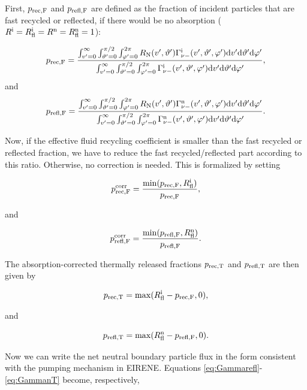 First, $p_{\mathrm{rec,F}}$ and $p_{\mathrm{refl,F}}$ are defined as the fraction of incident particles that are fast recycled or reflected, if there would be no absorption ($R^{\mathrm{i}} = R^{\mathrm{i}}_\mathrm{fl} = R^{\mathrm{n}} = R^{\mathrm{n}}_\mathrm{fl} = 1$):

\begin{equation}
    p_{\mathrm{rec,F}} =\frac{\int_{v'=0}^{\infty} \int_{\vartheta'=0}^{\pi/2} \int_{\varphi'=0}^{2\pi} R_{\mathrm{N}}(v',\vartheta') \Gamma_{\nu-}^{\mathrm{i}}(v',\vartheta',\varphi') \mathrm{d} v' \mathrm{d} \vartheta' \mathrm{d} \varphi'}{\int_{v'=0}^{\infty} \int_{\vartheta'=0}^{\pi/2} \int_{\varphi'=0}^{2\pi}  \Gamma_{\nu-}^{\mathrm{i}}(v',\vartheta',\varphi') \mathrm{d} v' \mathrm{d} \vartheta' \mathrm{d} \varphi'},
\end{equation}
and
\begin{equation}
    p_{\mathrm{refl,F}} =\frac{\int_{v'=0}^{\infty} \int_{\vartheta'=0}^{\pi/2} \int_{\varphi'=0}^{2\pi} R_{\mathrm{N}}(v',\vartheta') \Gamma_{\nu-}^{\mathrm{n}}(v',\vartheta',\varphi') \mathrm{d} v' \mathrm{d} \vartheta' \mathrm{d} \varphi'}{\int_{v'=0}^{\infty} \int_{\vartheta'=0}^{\pi/2} \int_{\varphi'=0}^{2\pi}  \Gamma_{\nu-}^{\mathrm{n}}(v',\vartheta',\varphi') \mathrm{d} v' \mathrm{d} \vartheta' \mathrm{d} \varphi'}.
\end{equation}

Now, if the effective fluid recycling coefficient is smaller than the fast recycled or reflected fraction, we have to reduce the fast recycled/reflected part according
to this ratio. Otherwise, no correction is needed. This is formalized by setting

\begin{equation}
    p_{\mathrm{rec,F}}^{\mathrm{corr}} = \frac{\mathrm{min}(p_{\mathrm{rec,F}},R^{\mathrm{i}}_\mathrm{fl})}{p_{\mathrm{rec,F}}},
\end{equation}

and

\begin{equation}
    p_{\mathrm{refl,F}}^{\mathrm{corr}} = \frac{\mathrm{min}(p_{\mathrm{refl,F}},R^{\mathrm{n}}_\mathrm{fl})}{p_{\mathrm{refl,F}}}.
\end{equation}

The absorption-corrected thermally released fractions $p_{\mathrm{rec,T}}$ and $p_{\mathrm{refl,T}}$ are then given by

\begin{equation}
    p_{\mathrm{rec,T}} = \mathrm{max}(R^{\mathrm{i}}_\mathrm{fl}-p_{\mathrm{rec,F}},0),
\end{equation}

and

\begin{equation}
    p_{\mathrm{refl,T}} = \mathrm{max}(R^{\mathrm{n}}_\mathrm{fl}-p_{\mathrm{refl,F}},0).
\end{equation}

Now we can write the net neutral boundary particle flux in the form consistent with the pumping mechanism in EIRENE. Equations \eqref{eq:Gammarefl}-\eqref{eq:GammanT} become, respectively,

